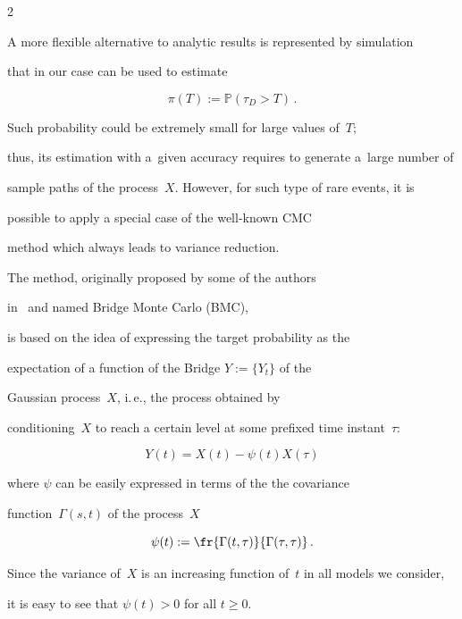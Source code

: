 \begin{multicols}{2}
\noindent

A more flexible alternative to analytic results is represented  by simulation 

that in our case can be used to estimate 

\begin{equation*}

\pi(T):=\mathbb{P} \left(\tau_D > T\right)\,.

\end{equation*}

Such probability could be extremely small for large values of~$T$; 

thus, its estimation with a~given accuracy requires to generate a~large number of 

sample paths of the process~$X$. However, for such type of rare events, it is 

possible to apply a special case of the well-known CMC 

method which always leads to variance reduction.



The method, originally proposed by some of the authors 

in~\cite{20-luk-1, 21-luk-1, 22-luk-1} and named Bridge Monte Carlo (BMC), 

is based on the idea of expressing the target probability as the

expectation of a function of the {Bridge} $Y:=\{Y_t\}$ of the

Gaussian process~$X$, i.\,e.,  the process obtained by

conditioning~$X$ to reach a certain level at some prefixed time instant~$\tau$:

\begin{equation*}

Y(t) = X(t) - \psi(t) X(\tau)

\end{equation*}

where $\psi$ can be easily  expressed in terms of the the covariance 

function~$\Gamma(s,t)$ of the process~$X$ 

$$

\psi(t)   :=

\fr{\Gamma(t,\tau)}{\Gamma(\tau, \tau)} \,.  

$$

Since the variance of~$X$ is an increasing function of~$t$ in all models we consider,

it is easy to see that  $\psi(t)>0$ for all $t \ge 0$.


\end{multicols}

